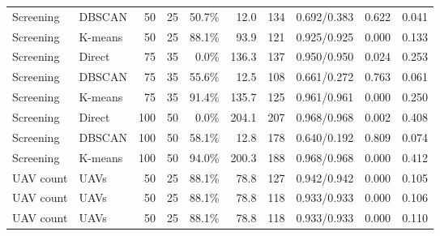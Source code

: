 \begin{table}[H]
\begin{tabularx}{\textwidth}{@{}>{\raggedright\arraybackslash}p{}>{\raggedright\arraybackslash}Xrrrrrrrr@{}}
Screening & DBSCAN & 50 & 25 & 50.7\% & 12.0 & 134 & 0.692/0.383 & 0.622 & 0.041 \\
\rowcolor{gray!10}
Screening & K-means & 50 & 25 & 88.1\% & 93.9 & 121 & 0.925/0.925 & 0.000 & 0.133 \\
Screening & Direct & 75 & 35 & 0.0\% & 136.3 & 137 & 0.950/0.950 & 0.024 & 0.253 \\
Screening & DBSCAN & 75 & 35 & 55.6\% & 12.5 & 108 & 0.661/0.272 & 0.763 & 0.061 \\
\rowcolor{gray!10}
Screening & K-means & 75 & 35 & 91.4\% & 135.7 & 125 & 0.961/0.961 & 0.000 & 0.250 \\
Screening & Direct & 100 & 50 & 0.0\% & 204.1 & 207 & 0.968/0.968 & 0.002 & 0.408 \\
Screening & DBSCAN & 100 & 50 & 58.1\% & 12.8 & 178 & 0.640/0.192 & 0.809 & 0.074 \\
\rowcolor{gray!10}
Screening & K-means & 100 & 50 & 94.0\% & 200.3 & 188 & 0.968/0.968 & 0.000 & 0.412 \\
\addlinespace[2pt]
UAV count & 2 UAVs & 50 & 25 & 88.1\% & 78.8 & 127 & 0.942/0.942 & 0.000 & 0.105 \\
UAV count & 4 UAVs & 50 & 25 & 88.1\% & 78.8 & 118 & 0.933/0.933 & 0.000 & 0.106 \\
\rowcolor{gray!10}
UAV count & 6 UAVs & 50 & 25 & 88.1\% & 78.8 & 118 & 0.933/0.933 & 0.000 & 0.110 \\
\bottomrule
\end{tabularx}
\end{table}
